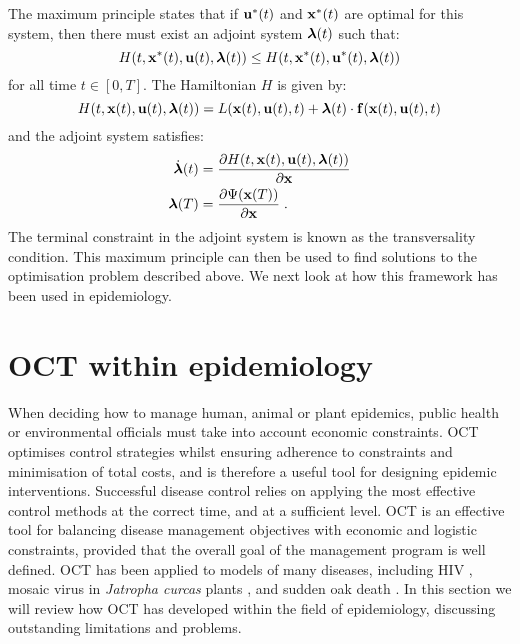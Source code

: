 The maximum principle states that if $\mathbf{\bm{u}}^*(t)$ and $\mathbf{\bm{x}}^*(t)$ are optimal for this system, then there must exist an adjoint system $\mathbf{\bm{\lambda}}(t)$ such that:
\begin{equation}
    H(t, \mathbf{\bm{x}}^*(t), \mathbf{\bm{u}}(t), \mathbf{\bm{\lambda}}(t)) \leq H(t, \mathbf{\bm{x}}^*(t), \mathbf{\bm{u}}^*(t), \mathbf{\bm{\lambda}}(t))
\end{equation}
for all time $t \in \left[0, T\right]$. The Hamiltonian $H$ is given by:
\begin{equation}\label{eqn:ch2:hamiltonian_general}
    H(t, \mathbf{\bm{x}}(t), \mathbf{\bm{u}}(t), \mathbf{\bm{\lambda}}(t)) = L(\mathbf{\bm{x}}(t), \mathbf{\bm{u}}(t), t) + \mathbf{\bm{\lambda}}(t)\cdot\mathbf{\bm{f}}(\mathbf{\bm{x}}(t), \mathbf{\bm{u}}(t), t)
\end{equation}
and the adjoint system satisfies:
\begin{subequations}\label{eqn:ch2:adjoint_system}
    \begin{align}
        \dot{\mathbf{\bm{\lambda}}}(t) &= \frac{\partial H(t, \mathbf{\bm{x}}(t), \mathbf{\bm{u}}(t), \mathbf{\bm{\lambda}}(t))}{\partial \mathbf{\bm{x}}} \label{eqn:ch2:adjoint_system_a}\\
        \mathbf{\bm{\lambda}}(T) &= \frac{\partial \Psi(\mathbf{\bm{x}}(T))}{\partial \mathbf{\bm{x}}}\;. \label{eqn:ch2:adjoint_system_b}
    \end{align}
\end{subequations}
The terminal constraint in the adjoint system is known as the transversality condition. This maximum principle can then be used to find solutions to the optimisation problem described above. We next look at how this framework has been used in epidemiology.

\section{OCT within epidemiology}\label{sec:ch2:oct_in_epidem}

When deciding how to manage human, animal or plant epidemics, public health or environmental officials must take into account economic constraints. OCT optimises control strategies whilst ensuring adherence to constraints and minimisation of total costs, and is therefore a useful tool for designing epidemic interventions. Successful disease control relies on applying the most effective control methods at the correct time, and at a sufficient level. OCT is an effective tool for balancing disease management objectives with economic and logistic constraints, provided that the overall goal of the management program is well defined. OCT has been applied to models of many diseases, including HIV \citep{kirschner_optimal_1997}, mosaic virus in \emph{Jatropha curcas} plants \citep{al_basir_impact_2017}, and sudden oak death \citep{mbah_optimization_2010}. In this section we will review how OCT has developed within the field of epidemiology, discussing outstanding limitations and problems.

